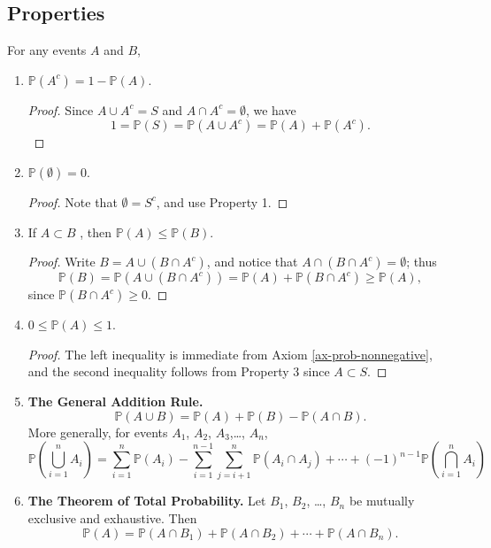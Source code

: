 \subsection{Properties}
\label{sec-4-4-2}

For any events \(A\) and \(B\),

\begin{enumerate}
\item \label{enu-prop-prob-complement} \(\mathbb{P}(A^{c})=1-\mathbb{P}(A)\).
\begin{proof}
Since \(A\cup A^{c}=S\) and \(A\cap A^{c}=\emptyset\), we have
\[
   1=\mathbb{P}(S)=\mathbb{P}(A\cup A^{c})=\mathbb{P}(A)+\mathbb{P}(A^{c}).
   \]
\end{proof}
\item \(\mathbb{P}(\emptyset)=0\).
\begin{proof}
Note that \(\emptyset=S^{c}\), and use Property 1.
\end{proof}
\item If \(A\subset B\) , then \(\mathbb{P}(A)\leq\mathbb{P}(B)\).
\begin{proof}
Write \(B=A\cup\left(B\cap A^{c}\right)\), and notice that \(A\cap\left(B\cap A^{c}\right)=\emptyset\); thus
\[
   \mathbb{P}(B)=\mathbb{P}(A\cup\left(B\cap A^{c}\right))=\mathbb{P}(A)+\mathbb{P}\left(B\cap A^{c}\right)\geq\mathbb{P}(A),
   \]
since \(\mathbb{P}\left(B\cap A^{c}\right)\ge0\). 
\end{proof}
\item \(0\leq\mathbb{P}(A)\leq1\).
\begin{proof}
The left inequality is immediate from Axiom \ref{ax-prob-nonnegative}, and the second inequality follows from Property 3 since \(A\subset S\).
\end{proof}

\item \textbf{The General Addition Rule.}
\begin{equation}
\label{eq-general-addition-rule-1}
\mathbb{P}(A\cup B)=\mathbb{P}(A)+\mathbb{P}(B)-\mathbb{P}(A\cap B).
\end{equation}
More generally, for events \(A_{1}\), \(A_{2}\), \(A_{3}\),\ldots{}, \(A_{n}\),
\begin{equation}
\mathbb{P}\left(\bigcup_{i=1}^{n}A_{i}\right)=\sum_{i=1}^{n}\mathbb{P}(A_{i})-\sum_{i=1}^{n-1}\sum_{j=i+1}^{n}\mathbb{P}(A_{i}\cap A_{j})+\cdots+(-1)^{n-1}\mathbb{P}\left(\bigcap_{i=1}^{n}A_{i}\right)
\end{equation}
\item \textbf{The Theorem of Total Probability.} Let \(B_{1}\), \(B_{2}\), \ldots{},
\(B_{n}\) be mutually exclusive and exhaustive. Then
\begin{equation}
\label{eq-theorem-total-probability}
\mathbb{P}(A)=\mathbb{P}(A\cap B_{1})+\mathbb{P}(A\cap B_{2})+\cdots+\mathbb{P}(A\cap B_{n}).
\end{equation}
\end{enumerate}

